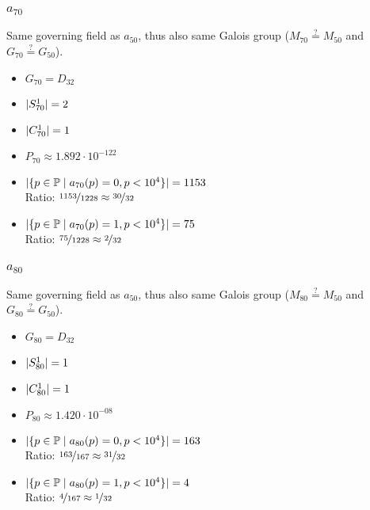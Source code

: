 \subsubsection{$a_{70}$}
Same governing field as $a_{50}$, thus also same Galois group ($M_{70} \stackrel{?}{=} M_{50}$ and $G_{70} \stackrel{?}{=} G_{50}$).
\begin{multicols}{2}
	\begin{itemize}
		\item $G_{70} = D_{32}$
		\item $| S_{70}^1 | = 2$
		\item $| C_{70}^1 | = 1$
		\item $P_{70} \approx 1.892 \cdot 10^{-122}$
	\end{itemize}
	\begin{itemize}
		\item $| \{ p \in \mathbb{P} \mid a_{70}(p)=0, p<10^4 \} | = 1153$\\
		Ratio: $\nicefrac{ 1153 }{ 1228 } \approx \nicefrac{ 30 }{ 32 }$
		\item $| \{ p \in \mathbb{P} \mid a_{70}(p)=1, p<10^4 \} | = 75$\\
		Ratio: $\nicefrac{ 75 }{ 1228 } \approx \nicefrac{ 2 }{ 32 }$
	\end{itemize}
\end{multicols}

\subsubsection{$a_{80}$}
Same governing field as $a_{50}$, thus also same Galois group ($M_{80} \stackrel{?}{=} M_{50}$ and $G_{80} \stackrel{?}{=} G_{50}$).
\begin{multicols}{2}
	\begin{itemize}
		\item $G_{80} = D_{32}$
		\item $| S_{80}^1 | = 1$
		\item $| C_{80}^1 | = 1$
		\item $P_{80} \approx 1.420 \cdot 10^{-08}$
	\end{itemize}
	\begin{itemize}
		\item $| \{ p \in \mathbb{P} \mid a_{80}(p)=0, p<10^4 \} | = 163$\\
		Ratio: $\nicefrac{ 163 }{ 167 } \approx \nicefrac{ 31 }{ 32 }$
		\item $| \{ p \in \mathbb{P} \mid a_{80}(p)=1, p<10^4 \} | = 4$\\
		Ratio: $\nicefrac{ 4 }{ 167 } \approx \nicefrac{ 1 }{ 32 }$
	\end{itemize}
\end{multicols}


